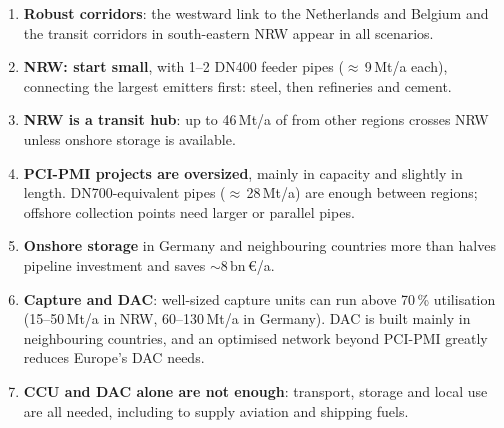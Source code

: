 \documentclass[a0,portrait]{a0poster}
\begin{document}
\setlength\posterColH{\dimexpr\ht\posterColA+\dp\posterColA}
\ifdim\dimexpr\ht\posterColB+\dp\posterColB>\posterColH \setlength\posterColH{\dimexpr\ht\posterColB+\dp\posterColB}\fi
\ifdim\dimexpr\ht\posterColC+\dp\posterColC>\posterColH \setlength\posterColH{\dimexpr\ht\posterColC+\dp\posterColC}\fi
\vspace*{0.5cm}
\noindent
{}\hspace{\columnsep}%
\hspace{\columnsep}%
\par


\vspace{1.8em}
\begin{tcolorbox}[postertab,title={Take-aways},colback=takegrey,colframe=takedark,arc=4mm,boxrule=1mm,toprule=1.2mm,left=1.1em,right=1.1em,top=1em,bottom=0.8em,before skip=0pt,after skip=0.6em,boxed title style={colback=takedark,colframe=takedark}]
\begin{multicols}{3}
\raggedcolumns
\begin{enumerate}
  \item \textbf{Robust corridors}: the westward link to the Netherlands and Belgium and the transit corridors in south-eastern NRW appear in all scenarios.
  \item \textbf{NRW: start small}, with 1--2 DN400 feeder pipes ($\approx$\,9\,Mt/a each), connecting the largest emitters first: steel, then refineries and cement.
  \item \textbf{NRW is a transit hub}: up to 46\,Mt/a of  from other regions crosses NRW unless onshore storage is available.
  \vfill\columnbreak
  \item \textbf{PCI-PMI  projects are oversized}, mainly in capacity and slightly in length. DN700-equivalent pipes ($\approx$\,28\,Mt/a) are enough between regions; offshore collection points need larger or parallel pipes.
  \vspace{1.2em}
  \item \textbf{Onshore storage} in Germany and neighbouring countries more than halves pipeline investment and saves $\sim$8\,bn\,\euro/a.
  \vfill\columnbreak
  \item \textbf{Capture and DAC}: well-sized capture units can run above 70\,\% utilisation (15--50\,Mt/a in NRW, 60--130\,Mt/a in Germany). DAC is built mainly in neighbouring countries, and an optimised network beyond PCI-PMI greatly reduces Europe's DAC needs.
  \item \textbf{CCU and DAC alone are not enough}: transport, storage and local use are all needed, including to supply aviation and shipping fuels.
\end{enumerate}
\end{multicols}
\end{tcolorbox}
\end{document}

